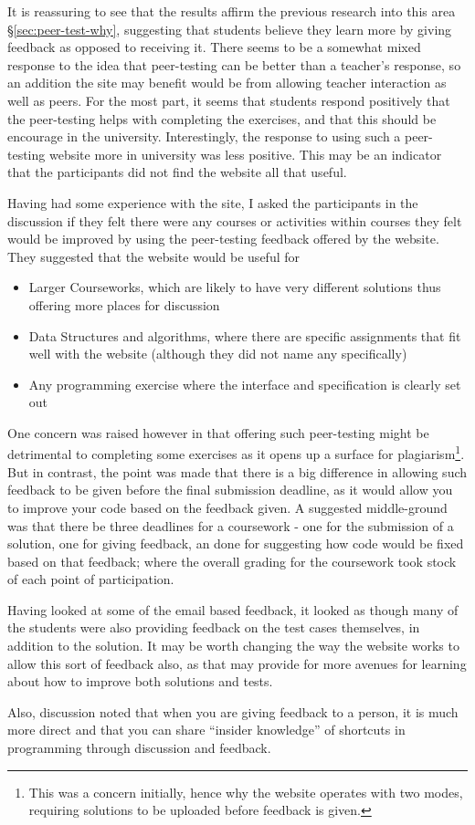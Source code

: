 \documentclass[a4paper,11pt]{report}
\begin{document}
It is reassuring to see that the results affirm the previous research into this area \S\ref{sec:peer-test-why}, suggesting that students believe they learn more by giving feedback as opposed to receiving it. There seems to be a somewhat mixed response to the idea that peer-testing can be better than a teacher's response, so an addition the site may benefit would be from allowing teacher interaction as well as peers. For the most part, it seems that students respond positively that the peer-testing helps with completing the exercises, and that this should be encourage in the university. Interestingly, the response to using such a peer-testing website more in university was less positive. This may be an indicator that the participants did not find the website all that useful.\par
Having had some experience with the site, I asked the participants in the discussion if they felt there were any courses or activities within courses they felt would be improved by using the peer-testing feedback offered by the website. They suggested that the website would be useful for
\begin{itemize}
\item Larger Courseworks, which are likely to have very different solutions thus offering more places for discussion
\item Data Structures and algorithms, where there are specific assignments that fit well with the website (although they did not name any specifically)
\item Any programming exercise where the interface and specification is clearly set out
\end{itemize}
One concern was raised however in that offering such peer-testing might be detrimental to completing some exercises as it opens up a surface for plagiarism\footnote{This was a concern initially, hence why the website operates with two modes, requiring solutions to be uploaded before feedback is given.}. But in contrast, the point was made that there is a big difference in allowing such feedback to be given before the final submission deadline, as it would allow you to improve your code based on the feedback given. A suggested middle-ground was that there be three deadlines for a coursework - one for the submission of a solution, one for giving feedback, an done for suggesting how code would be fixed based on that feedback; where the overall grading for the coursework took stock of each point of participation.\par
Having looked at some of the email based feedback, it looked as though many of the students were also providing feedback on the test cases themselves, in addition to the solution. It may be worth changing the way the website works to allow this sort of feedback also, as that may provide for more avenues for learning about how to improve both solutions and tests.\par
Also, discussion noted that when you are giving feedback to a person, it is much more direct and that you can share ``insider knowledge'' of shortcuts in programming through discussion and feedback.\par
\end{document}
